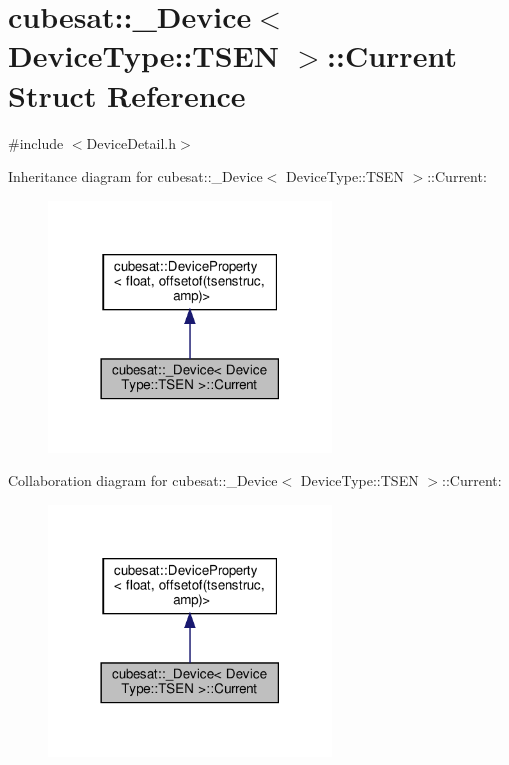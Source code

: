 \hypertarget{structcubesat_1_1__Device_3_01DeviceType_1_1TSEN_01_4_1_1Current}{}\section{cubesat\+:\+:\+\_\+\+Device$<$ Device\+Type\+:\+:T\+S\+EN $>$\+:\+:Current Struct Reference}
\label{structcubesat_1_1__Device_3_01DeviceType_1_1TSEN_01_4_1_1Current}


{\ttfamily \#include $<$Device\+Detail.\+h$>$}



Inheritance diagram for cubesat\+:\+:\+\_\+\+Device$<$ Device\+Type\+:\+:T\+S\+EN $>$\+:\+:Current\+:\nopagebreak
\begin{figure}[H]
\begin{center}
\leavevmode
\includegraphics[width=213pt]{structcubesat_1_1__Device_3_01DeviceType_1_1TSEN_01_4_1_1Current__inherit__graph}
\end{center}
\end{figure}


Collaboration diagram for cubesat\+:\+:\+\_\+\+Device$<$ Device\+Type\+:\+:T\+S\+EN $>$\+:\+:Current\+:\nopagebreak
\begin{figure}[H]
\begin{center}
\leavevmode
\includegraphics[width=213pt]{structcubesat_1_1__Device_3_01DeviceType_1_1TSEN_01_4_1_1Current__coll__graph}
\end{center}
\end{figure}
